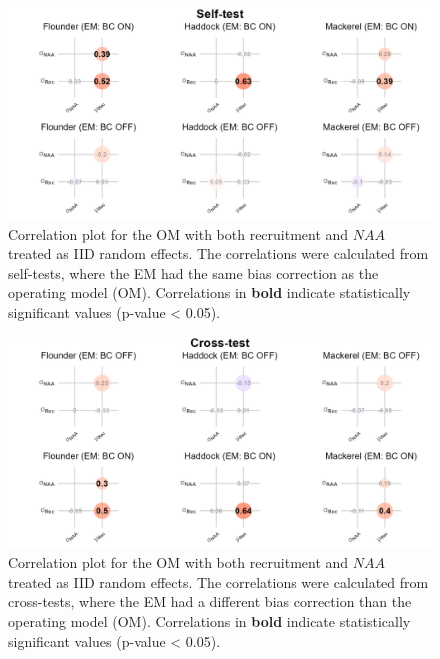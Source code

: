 \documentclass[
  12pt,
]{article}
\begin{document}
\begin{figure}[H]
    \centering
    \includegraphics[width=\textwidth]{Revised_Figures&Tables/Correlation_plot_NAA_iid.PNG}
    \caption{Correlation plot for the OM with both recruitment and $NAA$ treated as IID random effects. The correlations were calculated from self-tests, where the EM had the same bias correction as the operating model (OM). Correlations in \textbf{bold} indicate statistically significant values (p-value < 0.05).}
    \label{fig:supp_Cor_NAA_iid}
\end{figure}

\begin{figure}[H]
    \centering
    \includegraphics[width=\textwidth]{Revised_Figures&Tables/Correlation_plot_NAA_iid_mismatch.PNG}
    \caption{Correlation plot for the OM with both recruitment and $NAA$ treated as IID random effects. The correlations were calculated from cross-tests, where the EM had a different bias correction than the operating model (OM). Correlations in \textbf{bold} indicate statistically significant values (p-value < 0.05).}
    \label{fig:supp_Cor_NAA_iid_mis}
\end{figure}
\end{document}
